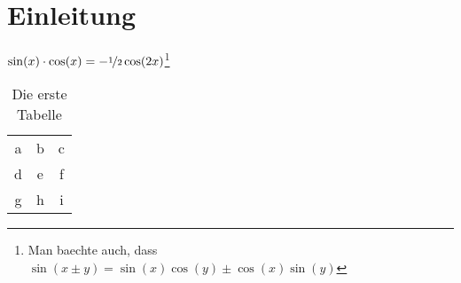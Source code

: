 
\chapter{Einleitung}

\blindtext$\sin(x)\cdot\cos(x) = -\nicefrac{1}{2} \cos(2x)$\footnote{Man baechte auch, dass $\sin(x\pm y) = \sin(x)\cos(y) \pm \cos(x)\sin(y)$}

\begin{table}[h]
  \centering
  \begin{tabular}{ccc}
    \toprule
    a & b & c\\
    d & e & f\\
    g & h & i\\
    \bottomrule
  \end{tabular}
  \caption[Erste Tabelle]{Die erste Tabelle}
  \label{tabelle1}
\end{table}